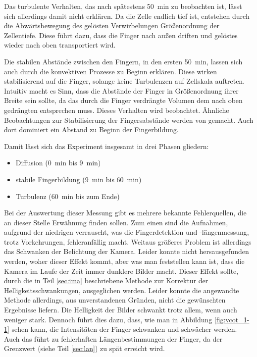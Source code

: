 Das turbulente Verhalten, das nach spätestens \SI{50}{\minute} zu beobachten ist, lässt sich allerdings damit nicht erklären. Da die Zelle endlich tief ist, entstehen durch die Abwärtsbewegung des gelösten \COT Verwirbelungen Größenordnung der Zellentiefe. Diese führt dazu, dass die Finger nach außen driften und gelöstes \COT wieder nach oben transportiert wird.
 
Die stabilen Abstände zwischen den Fingern, in den ersten \SI{50}{\minute}, lassen sich auch durch die konvektiven Prozesse zu Beginn erklären. Diese wirken stabilisierend auf die Finger, solange keine Turbulenzen auf Zellskala auftreten.
Intuitiv macht es Sinn, dass die Abstände der Finger in Größenordnung ihrer Breite sein sollte, da das durch die Finger verdrängte Volumen dem nach oben gedrängten entsprechen muss. Dieses Verhalten wird beobachtet.
Ähnliche Beobachtungen zur Stabilisierung der Fingersabstände werden von \cite{fernandez} gemacht. Auch dort dominiert ein Abstand zu Beginn der Fingerbildung. 

Damit lässt sich das Experiment insgesamt in drei Phasen gliedern:
\begin{itemize}
 \item Diffusion (\SI{0}{\minute} bis \SI{9}{\minute})
 \item stabile Fingerbildung (\SI{9}{\minute} bis \SI{60}{\minute})
 \item Turbulenz (\SI{60}{\minute} bis zum Ende) 
\end{itemize}


Bei der Auswertung dieser Messung gibt es mehrere bekannte Fehlerquellen, die an dieser Stelle Erwähnung finden sollen. Zum einen sind die Aufnahmen, aufgrund der niedrigen verrauscht, was die Fingerdetektion und -längenmessung, trotz Vorkehrungen, fehleranfällig macht.
Weitaus größeres Problem ist allerdings das Schwanken der Belichtung der Kamera. Leider konnte nicht hersausgefunden werden, woher dieser Effekt kommt, aber was man feststellen kann ist, dass die Kamera im Laufe der Zeit immer dunklere Bilder macht. Dieser Effekt sollte, durch die in Teil \ref{sec:ima} beschriebene Methode zur Korrektur der Helligkeitsschwankungen, ausgeglichen werden. Leider konnte die angewandte Methode allerdings, aus unverstandenen Gründen, nicht die gewünschten Ergebnisse liefern. Die Helligkeit der Bilder schwankt trotz allem, wenn auch weniger stark. Dennoch führt dies dazu, dass, wie man in Abbildung \ref{fig:vcot_1-1} sehen kann, die Intensitäten der Finger schwanken und schwächer werden. Auch das führt zu fehlerhaften Längenbestimmungen der Finger, da der Grenzwert (siehe Teil \ref{sec:lan}) zu spät erreicht wird.

